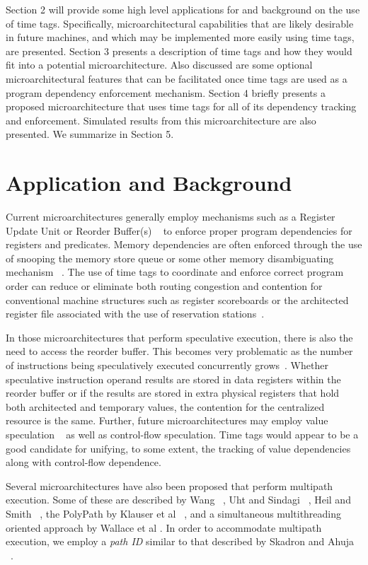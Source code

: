 \documentclass[10pt,dvips]{article}
\begin{document}
Section 2 will provide some high level applications for and background on
the use of time tags.  Specifically, microarchitectural capabilities
that are likely desirable in future machines, and which may be implemented 
more easily using time tags, are presented.
Section 3 presents a description of time tags and how they would
fit into a potential microarchitecture.  
Also discussed are
some optional microarchitectural features
that can be facilitated once time tags are used as
a program dependency enforcement mechanism.
Section 4 briefly presents a proposed microarchitecture
that uses time tags for all of its dependency tracking and enforcement.
Simulated results from this microarchitecture are also presented.
We summarize in Section 5.
%
%
\section{Application and Background}
%
Current microarchitectures generally employ mechanisms such as a
Register Update Unit or Reorder Buffer(s) ~\cite{Bannon95,Smith95,Kessler98}
to enforce
proper program dependencies for registers and predicates.
Memory dependencies are often enforced through the use of
snooping the memory store queue or some other memory disambiguating
mechanism ~\cite{Sohi96}.
The use of time tags to coordinate and enforce correct program
order can reduce or eliminate both routing congestion and
contention for conventional machine structures such as
register scoreboards \cite{Thornton64} 
or the architected register file associated
with the use of reservation stations~\cite{Anderson67}.

In those microarchitectures
that perform speculative execution, there is also
the need to access the reorder buffer.  This becomes very problematic
as the number of instructions being speculatively executed concurrently
grows~\cite{Palacharla97}.  
Whether speculative instruction operand
results are stored in data registers within the reorder buffer or if the
results are stored in extra physical registers that hold both architected
and temporary values, the contention for the centralized resource is
the same.
Further, future microarchitectures may employ value speculation
~\cite{lipasti96exceeding,lipasti97performance,gonzalez98limits}
as well as control-flow speculation.
Time tags would appear to be a good candidate for unifying, to some
extent, the tracking of value dependencies along with control-flow
dependence.

Several microarchitectures have also been proposed that perform multipath
execution.  Some of these are described by Wang ~\cite{Wang90}, 
Uht and Sindagi ~\cite{Uht95},
Heil and Smith ~\cite{Heil96},
the PolyPath by Klauser et al ~\cite{Klauser98},
and a simultaneous multithreading oriented approach by
Wallace et al \cite{Wallace98}. 
In order to accommodate multipath execution, we 
employ a \textit{path ID} similar to that described by Skadron
and Ahuja ~\cite{Skadron01}.
\end{document}
